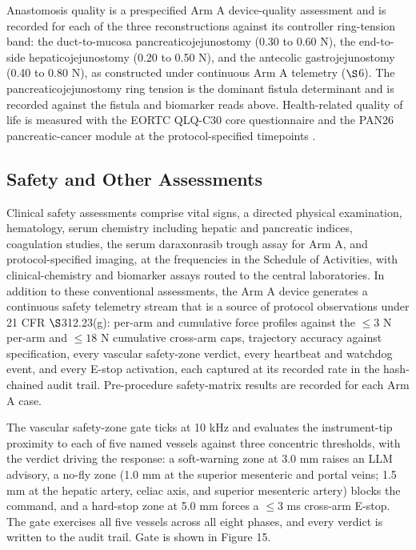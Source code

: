 Anastomosis quality is a prespecified Arm A device-quality assessment and is recorded
for each of the three reconstructions against its controller ring-tension band: the
duct-to-mucosa pancreaticojejunostomy (0.30 to 0.60 N), the end-to-side
hepaticojejunostomy (0.20 to 0.50 N), and the antecolic gastrojejunostomy (0.40 to
0.80 N), as constructed under continuous Arm A telemetry ($\S$6). The
pancreaticojejunostomy ring tension is the dominant fistula determinant and is
recorded against the fistula and biomarker reads above. Health-related quality of
life is measured with the EORTC QLQ-C30 core questionnaire and the PAN26
pancreatic-cancer module at the protocol-specified timepoints \cite{EORTCqlqc30}.

\subsection{Safety and Other Assessments}

Clinical safety assessments comprise vital signs, a directed physical examination,
hematology, serum chemistry including hepatic and pancreatic indices, coagulation
studies, the serum daraxonrasib trough assay for Arm A, and protocol-specified
imaging, at the frequencies in the Schedule of Activities, with clinical-chemistry
and biomarker assays routed to the central laboratories. In addition to these
conventional assessments, the Arm A device generates a continuous safety telemetry
stream that is a source of protocol observations under 21 CFR $\S$312.23(g): per-arm
and cumulative force profiles against the $\leq 3$ N per-arm and $\leq 18$ N
cumulative cross-arm caps, trajectory accuracy against specification, every vascular
safety-zone verdict, every heartbeat and watchdog event, and every E-stop
activation, each captured at its recorded rate in the hash-chained audit trail.
Pre-procedure safety-matrix results are recorded for each Arm A case.

The vascular safety-zone gate ticks at 10 kHz and evaluates the instrument-tip
proximity to each of five named vessels against three concentric thresholds, with
the verdict driving the response: a soft-warning zone at 3.0 mm raises an LLM
advisory, a no-fly zone (1.0 mm at the superior mesenteric and portal veins; 1.5 mm
at the hepatic artery, celiac axis, and superior mesenteric artery) blocks the
command, and a hard-stop zone at 5.0 mm forces a $\leq 3$ ms cross-arm E-stop. The
gate exercises all five vessels across all eight phases, and every
verdict is written to the audit trail. Gate is shown in Figure 15.

